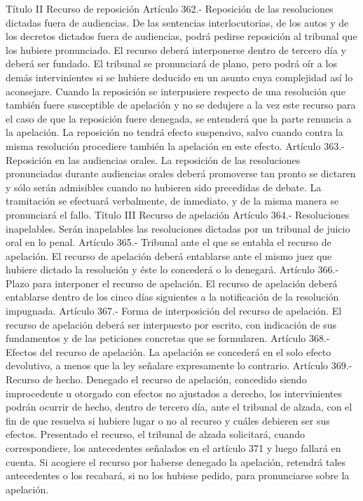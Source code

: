     Título II
    Recurso de reposición
    Artículo 362.- Reposición de las resoluciones dictadas fuera de audiencias. De las sentencias interlocutorias, de los autos y de los decretos dictados fuera de audiencias, podrá pedirse reposición al tribunal que los hubiere pronunciado. El recurso deberá interponerse dentro de tercero día y deberá ser fundado.
    El tribunal se pronunciará de plano, pero podrá oír a los demás intervinientes si se hubiere deducido en un asunto cuya complejidad así lo aconsejare.
    Cuando la reposición se interpusiere respecto de una resolución que también fuere susceptible de apelación y no se dedujere a la vez este recurso para el caso de que la reposición fuere denegada, se entenderá que la parte renuncia a la apelación.
    La reposición no tendrá efecto suspensivo, salvo cuando contra la misma resolución procediere también la apelación en este efecto.
    Artículo 363.- Reposición en las audiencias orales. La reposición de las resoluciones pronunciadas durante audiencias orales deberá promoverse tan pronto se dictaren y sólo serán admisibles cuando no hubieren sido precedidas de debate. La tramitación se efectuará verbalmente, de inmediato, y de la misma manera se pronunciará el fallo.
    Título III
    Recurso de apelación
    Artículo 364.- Resoluciones inapelables. Serán inapelables las resoluciones dictadas por un tribunal de juicio oral en lo penal.
    Artículo 365.- Tribunal ante el que se entabla el recurso de apelación. El recurso de apelación deberá entablarse ante el mismo juez que hubiere dictado la resolución y éste lo concederá o lo denegará.
    Artículo 366.- Plazo para interponer el recurso de apelación. El recurso de apelación deberá entablarse dentro de los cinco días siguientes a la notificación de la resolución impugnada.
    Artículo 367.- Forma de interposición del recurso de apelación. El recurso de apelación deberá ser interpuesto por escrito, con indicación de sus fundamentos y de las peticiones concretas que se formularen.
    Artículo 368.- Efectos del recurso de apelación. La apelación se concederá en el solo efecto devolutivo, a menos que la ley señalare expresamente lo contrario.
    Artículo 369.- Recurso de hecho. Denegado el recurso de apelación, concedido siendo improcedente u otorgado con efectos no ajustados a derecho, los intervinientes podrán ocurrir de hecho, dentro de tercero día, ante el tribunal de alzada, con el fin de que resuelva si hubiere lugar o no al recurso y cuáles debieren ser sus efectos.
    Presentado el recurso, el tribunal de alzada solicitará, cuando correspondiere, los antecedentes señalados en el artículo 371 y luego fallará en cuenta. Si acogiere el recurso por haberse denegado la apelación, retendrá tales antecedentes o los recabará, si no los hubiese pedido, para pronunciarse sobre la apelación.
